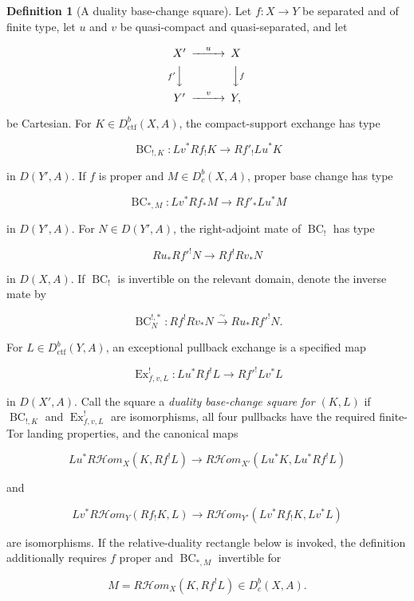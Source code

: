 \documentclass[10pt]{article}
\theoremstyle{definition}
\newtheorem{definition}[theorem]{Definition}
\newcommand{\Dbc}{D^b_c}
\newcommand{\Dctf}{D^b_{\mathrm{ctf}}}
\newcommand{\RHom}{R\mathcal Hom}
\begin{document}
\begin{definition}[A duality base-change square]
Let \(f:X\to Y\) be separated and of finite type, let \(u\) and \(v\) be
quasi-compact and quasi-separated, and let

\[
\begin{CD}
X' @>{u}>> X\\
@V{f'}VV @VV{f}V\\
Y' @>{v}>> Y,
\end{CD}
\]

be Cartesian.  For \(K\in\Dctf(X,A)\), the compact-support exchange has
type

\[
 \operatorname{BC}_{!,K}:Lv^*Rf_!K
 \longrightarrow Rf'_!Lu^*K
\]

in \(D(Y',A)\).  If \(f\) is proper and \(M\in\Dbc(X,A)\), proper base
change has type

\[
 \operatorname{BC}_{*,M}:Lv^*Rf_*M
 \longrightarrow Rf'_*Lu^*M
\]

in \(D(Y',A)\).  For \(N\in D(Y',A)\), the right-adjoint mate of
\(\operatorname{BC}_!\) has type

\[
 Ru_*Rf'^!N\longrightarrow Rf^!Rv_*N
\]

in \(D(X,A)\).  If \(\operatorname{BC}_!\) is invertible on the relevant
domain, denote the inverse mate by

\[
 \operatorname{BC}^{!,*}_N:Rf^!Rv_*N
 \xrightarrow{\sim}Ru_*Rf'^!N.
\]

For \(L\in\Dctf(Y,A)\), an exceptional pullback exchange is a specified map

\[
 \operatorname{Ex}^!_{f,v,L}:Lu^*Rf^!L
 \longrightarrow Rf'^!Lv^*L
\]

in \(D(X',A)\).  Call the square a \emph{duality base-change square for
\((K,L)\)} if \(\operatorname{BC}_{!,K}\) and
\(\operatorname{Ex}^!_{f,v,L}\) are isomorphisms, all four pullbacks have the
required finite-Tor landing properties, and the canonical maps

\[
 Lu^*\RHom_X(K,Rf^!L)\longrightarrow
 \RHom_{X'}(Lu^*K,Lu^*Rf^!L)
\]

and

\[
 Lv^*\RHom_Y(Rf_!K,L)\longrightarrow
 \RHom_{Y'}(Lv^*Rf_!K,Lv^*L)
\]

are isomorphisms.  If the relative-duality rectangle below is invoked, the
definition additionally requires \(f\) proper and
\(\operatorname{BC}_{*,M}\) invertible for

\[
 M=\RHom_X(K,Rf^!L)\in\Dbc(X,A).
\]
\end{definition}
\end{document}
